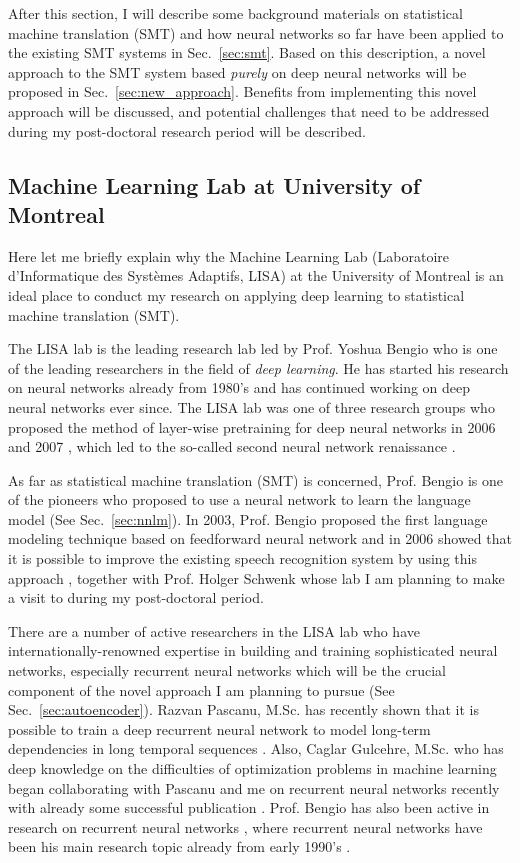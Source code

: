 \documentclass[11pt, oneside]{essay}
\begin{document}
After this section, I will describe some background materials on
statistical machine translation (SMT) and how neural networks so
far have been applied to the existing SMT systems in
Sec.~\ref{sec:smt}. Based on this description, a novel approach to
the SMT system based \textit{purely} on deep neural networks will
be proposed in Sec.~\ref{sec:new_approach}.  Benefits from
implementing this novel approach will be discussed, and
potential challenges that need to be addressed during my
post-doctoral research period will be described.

\subsection{Machine Learning Lab at University of Montreal}

Here let me briefly explain why the Machine Learning Lab
(Laboratoire d'Informatique des Syst\`emes Adaptifs, LISA) at the
University of Montreal is an ideal place to conduct my research on
applying deep learning to statistical machine translation (SMT).

The LISA lab is the leading research lab led by Prof. Yoshua
Bengio who is one of the leading researchers in the field of
\textit{deep learning}. He has started his research on neural
networks already from 1980's and has continued working on deep
neural networks ever since. The LISA lab was one of three
research groups who proposed the method of layer-wise pretraining
for deep neural networks in 2006 and 2007 \citep{Bengio2007nips},
which led to the so-called second neural network renaissance
\citep{Schmidhuber2011}.

As far as statistical machine translation (SMT) is concerned, Prof.
Bengio is one of the pioneers who proposed to use a neural
network to learn the language model (See Sec.~\ref{sec:nnlm}). In
2003, Prof. Bengio proposed the first language modeling technique
based on feedforward neural network \citep{Bengio2003} and in
2006 showed that it is possible to improve the existing speech
recognition system by using this approach \citep{Bengio2006},
together with Prof.  Holger Schwenk whose lab I am
planning to make a visit to during my post-doctoral
period.

There are a number of active researchers in the LISA lab who have
internationally-renowned expertise in building and training
sophisticated neural networks, especially recurrent neural
networks which will be the crucial component of the novel
approach I am planning to pursue (See
Sec.~\ref{sec:autoencoder}). Razvan Pascanu, M.Sc. has recently
shown that it is possible to train a deep recurrent neural
network to model long-term dependencies in long temporal
sequences \citep{Pascanu2013}. Also, Caglar Gulcehre, M.Sc. who
has deep knowledge on the difficulties of optimization problems
in machine learning \citep{Gulcehre2013a} began
collaborating with Pascanu and me on recurrent neural networks
recently with already some successful publication
\citep{Pascanu2013}. Prof. Bengio has also been active in
research on recurrent neural networks \citep[see,
e.g.,][]{Bengio2013rec}, where recurrent
neural networks have been his main research topic
already from early 1990's \citep[see,
e.g.,][]{Bengio1994}.
\end{document}
